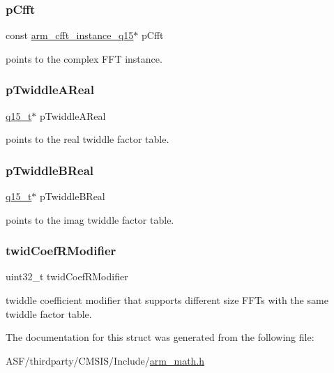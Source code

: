 \subsubsection{\texorpdfstring{pCfft}{pCfft}}
{\footnotesize\ttfamily const \mbox{\hyperlink{structarm__cfft__instance__q15}{arm\+\_\+cfft\+\_\+instance\+\_\+q15}}$\ast$ p\+Cfft}

points to the complex F\+FT instance. \mbox{\label{structarm__rfft__instance__q15_ac17beaa033ab1ea242d49037276b67e2}} 
\subsubsection{\texorpdfstring{pTwiddleAReal}{pTwiddleAReal}}
{\footnotesize\ttfamily \mbox{\hyperlink{arm__math_8h_ab5a8fb21a5b3b983d5f54f31614052ea}{q15\+\_\+t}}$\ast$ p\+Twiddle\+A\+Real}

points to the real twiddle factor table. \mbox{\label{structarm__rfft__instance__q15_a67a618de57c3a7420ee05fda1a80bf3a}} 
\subsubsection{\texorpdfstring{pTwiddleBReal}{pTwiddleBReal}}
{\footnotesize\ttfamily \mbox{\hyperlink{arm__math_8h_ab5a8fb21a5b3b983d5f54f31614052ea}{q15\+\_\+t}}$\ast$ p\+Twiddle\+B\+Real}

points to the imag twiddle factor table. \mbox{\label{structarm__rfft__instance__q15_a5b06f7f76c018db993fe6acc5708c589}} 
\subsubsection{\texorpdfstring{twidCoefRModifier}{twidCoefRModifier}}
{\footnotesize\ttfamily uint32\+\_\+t twid\+Coef\+R\+Modifier}

twiddle coefficient modifier that supports different size F\+F\+Ts with the same twiddle factor table. 

The documentation for this struct was generated from the following file\+:\begin{DoxyCompactItemize}
\item 
A\+S\+F/thirdparty/\+C\+M\+S\+I\+S/\+Include/\mbox{\hyperlink{arm__math_8h}{arm\+\_\+math.\+h}}\end{DoxyCompactItemize}
